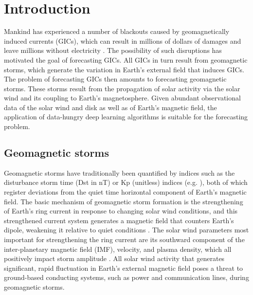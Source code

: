 \documentclass[draft,linenumbers]{agujournal2018}
\begin{document}

\section{Introduction}
% 
Mankind has experienced a number of blackouts caused by geomagnetically induced currents (GICs), which can result in millions of dollars of damages and leave millions without electricity \citep{Bolduc2002, Love2018}. The possibility of such disruptions has motivated the goal of forecasting GICs. All GICs in turn result from geomagnetic storms, which generate the variation in Earth's external field that induces GICs. The problem of forecasting GICs then amounts to forecasting geomagnetic storms. These storms result from the propagation of solar activity via the solar wind and its coupling to Earth's magnetosphere. Given abundant observational data of the solar wind and disk as well as of Earth's magnetic field, the application of data-hungry deep learning algorithms is suitable for the forecasting problem.  


\subsection{Geomagnetic storms}\label{sec:SW}

Geomagnetic storms have traditionally been quantified by indices such as the disturbance storm time (Dst in nT) or Kp (unitless) indices (e.g. \cite{Bartels1939}), both of which register deviations from the quiet time horizontal component of Earth's magnetic field. The basic mechanism of geomagnetic storm formation is the strengthening of Earth's ring current in response to changing solar wind conditions, and this strengthened current system generates a magnetic field that counters Earth's dipole, weakening it relative to quiet conditions \citep{Daglis1999}. The solar wind parameters most important for strengthening the ring current are its southward component of the inter-planetary magnetic field (IMF), velocity, and plasma density, which all positively impact storm amplitude \citep{Wolf1997,Gonzalez1999,Daglis1999}. All solar wind activity that generates significant, rapid fluctuation in Earth's external magnetic field poses a threat to ground-based conducting systems, such as power and communication lines, during geomagnetic storms.
\end{document}

